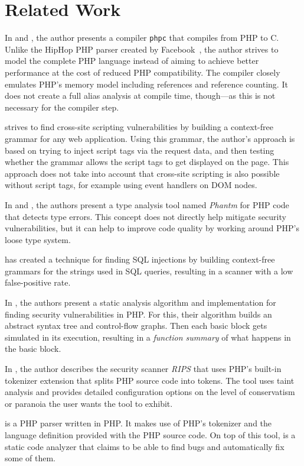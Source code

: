 \chapter{Related Work}
\label{related-work}

In \cite{phpc-thesis} and \cite{phpc-paper}, the author presents a compiler \texttt{phpc} that compiles from PHP to C. Unlike the HipHop PHP parser created by Facebook~\cite{hiphop}, the author strives to model the complete PHP language instead of aiming to achieve better performance at the cost of reduced PHP compatibility. The compiler closely emulates PHP's memory model including references and reference counting. It does not create a full alias analysis at compile time, though---as this is not necessary for the compiler step.

\cite{xss-via-grammar} strives to find cross-site scripting vulnerabilities by building a context-free grammar for any web application. Using this grammar, the author's approach is based on trying to inject script tags via the request data, and then testing whether the grammar allows the script tags to get displayed on the page. This approach does not take into account that cross-site scripting is also possible without script tags, for example using event handlers on DOM nodes.

In \cite{phantom-1} and \cite{phantom-2}, the authors present a type analysis tool named \emph{Phantm} for PHP code that detects type errors. This concept does not directly help mitigate security vulnerabilities, but it can help to improve code quality by working around PHP's loose type system.

\cite{wassermann-sound} has created a technique for finding SQL injections by building context-free grammars for the strings used in SQL queries, resulting in a scanner with a low false-positive rate.

In \cite{static-php}, the authors present a static analysis algorithm and implementation for finding security vulnerabilities in PHP. For this, their algorithm builds an abstract syntax tree and control-flow graphs. Then each basic block gets simulated in its execution, resulting in a \emph{function summary} of what happens in the basic block.

In \cite{rips}, the author describes the security scanner \emph{RIPS} that uses PHP's built-in tokenizer extension that splits PHP source code into tokens. The tool uses taint analysis and provides detailed configuration options on the level of conservatism or paranoia the user wants the tool to exhibit.

\cite{php-parser-popov} is a PHP parser written in PHP. It makes use of PHP's tokenizer and the language definition provided with the PHP source code. On top of this tool, \cite{php-analyzer} is a static code analyzer that claims to be able to find bugs and automatically fix some of them.
